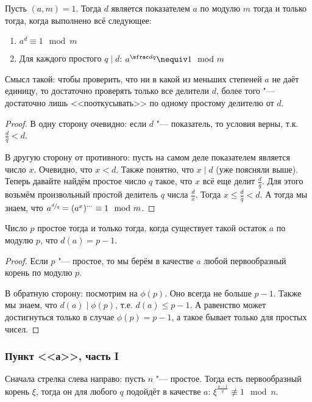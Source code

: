 		\begin{lemma}\label{day160309_criterion_order}
			Пусть $(a, m)=1$.
			Тогда $d$ является показателем $a$ по модулю $m$ тогда и только тогда, когда выполнено всё следующее:
			\begin{enumerate}
				\item $a^d \equiv 1 \mod m$
				\item Для каждого простого $q \mid d$: $a^{\sfrac dq} \nequiv 1 \mod m$
			\end{enumerate}
		\end{lemma}
		\begin{Rem}
			Смысл такой: чтобы проверить, что ни в какой из меньших степеней $a$ не даёт единицу,
			то достаточно проверять только все делители $d$, более того "--- достаточно лишь
			<<пооткусывать>> по одному простому делителю от $d$.
		\end{Rem}
		\begin{proof}
			В одну сторону очевидно: если $d$ "--- показатель, то условия верны,
			т.к. $\frac dq < d$.
	
			В другую сторону от противного: пусть на самом деле показателем является число $x$.
			Очевидно, что $x < d$.
			Также понятно, что $x \mid d$ (уже поясняли выше).
			Теперь давайте найдём простое число $q$ такое, что $x$ всё еще делит $\frac d q$.
			Для этого возьмём произвольный простой делитель $q$ числа $\frac d x$.
			Тогда $x \le \frac d q < d$.
			А тогда мы знаем, что $a^{\sfrac dq} = \left(a^x\right)^{\dots} \equiv 1 \mod m$.
		\end{proof}

		\begin{lemma}
			Число $p$ простое тогда и только тогда, когда существует такой остаток $a$ по модулю $p$,
			что $d(a)=p-1$.
		\end{lemma}
		\begin{proof}
			Если $p$ "--- простое, то мы берём в качестве $a$ любой первообразный корень по модулю $p$.
	
			В обратную сторону: посмотрим на $\phi(p)$.
			Оно всегда не больше $p-1$.
			Также мы знаем, что $d(a)\mid \phi(p)$, т.е. $d(a) \le p-1$.
			А равенство может достигнуться только в случае $\phi(p)=p-1$, а такое бывает только для простых чисел.
		\end{proof}
	
	\subsubsection{Пункт <<а>>, часть I}
		Сначала стрелка слева направо: пусть $n$ "--- простое.
		Тогда есть первообразный корень $\xi$, тогда он для любого $q$
		подойдёт в качестве $a$: $\xi^{\frac{n-1}{q}} \nequiv 1 \mod n$.

